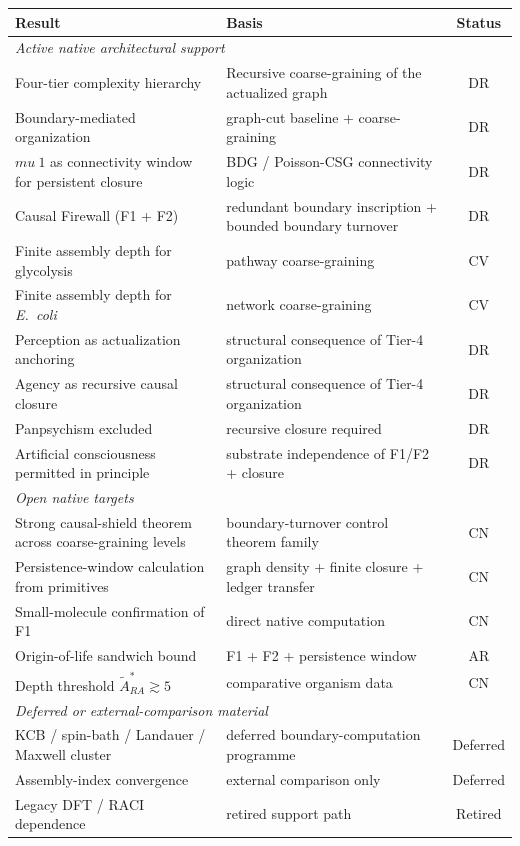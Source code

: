 \documentclass[11pt]{article}
\def\mu{mu}%
\def\mathrm#1{#1}%
\def\approx{~}%
\begin{document}
\begin{center}
\begin{tabular}{llc}
\toprule
Result & Basis & Status \\
\midrule
\multicolumn{3}{l}{\textit{Active native architectural support}} \\
Four-tier complexity hierarchy & Recursive coarse-graining of the actualized graph & DR \\
Boundary-mediated organization & graph-cut baseline + coarse-graining & DR \\
$\mu\approx 1$ as connectivity window for persistent closure & BDG / Poisson-CSG connectivity logic & DR \\
Causal Firewall (F1 + F2) & redundant boundary inscription + bounded boundary turnover & DR \\
Finite assembly depth for glycolysis & pathway coarse-graining & CV \\
Finite assembly depth for \emph{E.~coli} & network coarse-graining & CV \\
Perception as actualization anchoring & structural consequence of Tier-4 organization & DR \\
Agency as recursive causal closure & structural consequence of Tier-4 organization & DR \\
Panpsychism excluded & recursive closure required & DR \\
Artificial consciousness permitted in principle & substrate independence of F1/F2 + closure & DR \\
\midrule
\multicolumn{3}{l}{\textit{Open native targets}} \\
Strong causal-shield theorem across coarse-graining levels & boundary-turnover control theorem family & CN \\
Persistence-window calculation from primitives & graph density + finite closure + ledger transfer & CN \\
Small-molecule confirmation of F1 & direct native computation & CN \\
Origin-of-life sandwich bound & F1 + F2 + persistence window & AR \\
Depth threshold $\tilde{A}_{\mathrm{RA}}^* \gtrsim 5$ & comparative organism data & CN \\
\midrule
\multicolumn{3}{l}{\textit{Deferred or external-comparison material}} \\
KCB / spin-bath / Landauer / Maxwell cluster & deferred boundary-computation programme & Deferred \\
Assembly-index convergence & external comparison only & Deferred \\
Legacy DFT / RACI dependence & retired support path & Retired \\
\bottomrule
\end{tabular}
\end{center}
\end{document}
